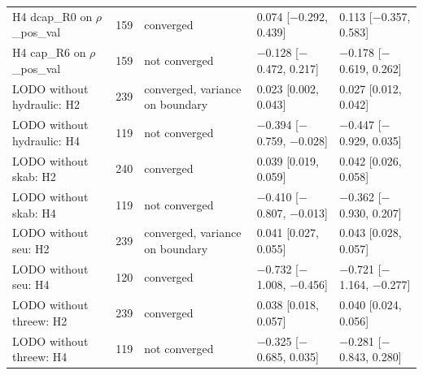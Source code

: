 \begin{tabular}{@{}l r >{\raggedright\arraybackslash}p{1.7cm} l l@{}}
H4 dcap\_R0 on $\rho$\_pos\_val & 159 & converged & 0.074 [$-$0.292, 0.439] & 0.113 [$-$0.357, 0.583] \\
H4 cap\_R6 on $\rho$\_pos\_val & 159 & not converged & $-$0.128 [$-$0.472, 0.217] & $-$0.178 [$-$0.619, 0.262] \\
LODO without hydraulic: H2 & 239 & converged, variance on boundary & 0.023 [0.002, 0.043] & 0.027 [0.012, 0.042] \\
LODO without hydraulic: H4 & 119 & not converged & $-$0.394 [$-$0.759, $-$0.028] & $-$0.447 [$-$0.929, 0.035] \\
LODO without skab: H2 & 240 & converged & 0.039 [0.019, 0.059] & 0.042 [0.026, 0.058] \\
LODO without skab: H4 & 119 & not converged & $-$0.410 [$-$0.807, $-$0.013] & $-$0.362 [$-$0.930, 0.207] \\
LODO without seu: H2 & 239 & converged, variance on boundary & 0.041 [0.027, 0.055] & 0.043 [0.028, 0.057] \\
LODO without seu: H4 & 120 & converged & $-$0.732 [$-$1.008, $-$0.456] & $-$0.721 [$-$1.164, $-$0.277] \\
LODO without threew: H2 & 239 & converged & 0.038 [0.018, 0.057] & 0.040 [0.024, 0.056] \\
LODO without threew: H4 & 119 & not converged & $-$0.325 [$-$0.685, 0.035] & $-$0.281 [$-$0.843, 0.280] \\
\bottomrule
\end{tabular}
